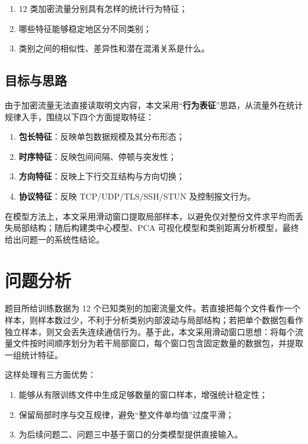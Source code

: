 \documentclass[UTF8,a4paper,12pt]{ctexart}
\begin{document}
\begin{enumerate}[label=(\arabic*)]
    \item 12 类加密流量分别具有怎样的统计行为特征；
    \item 哪些特征能够稳定地区分不同类别；
    \item 类别之间的相似性、差异性和潜在混淆关系是什么。
\end{enumerate}

\subsection{目标与思路}
由于加密流量无法直接读取明文内容，本文采用“\textbf{行为表征}”思路，从流量外在统计规律入手，围绕以下四个方面提取特征：
\begin{enumerate}[label=(\arabic*)]
    \item \textbf{包长特征}：反映单包数据规模及其分布形态；
    \item \textbf{时序特征}：反映包间间隔、停顿与突发性；
    \item \textbf{方向特征}：反映上下行交互结构与方向切换；
    \item \textbf{协议特征}：反映 TCP/UDP/TLS/SSH/STUN 及控制报文行为。
\end{enumerate}

在模型方法上，本文采用滑动窗口提取局部样本，以避免仅对整份文件求平均而丢失局部结构；随后构建类中心模型、PCA 可视化模型和类别距离分析模型，最终给出问题一的系统性结论。

\section{问题分析}

题目所给训练数据为 12 个已知类别的加密流量文件。若直接把每个文件看作一个样本，则样本数过少，不利于分析类别内部波动与局部结构；若把单个数据包看作独立样本，则又会丢失连续通信行为。基于此，本文采用滑动窗口思想：将每个流量文件按时间顺序划分为若干局部窗口，每个窗口包含固定数量的数据包，并提取一组统计特征。

这样处理有三方面优势：

\begin{enumerate}[label=(\arabic*)]
    \item 能够从有限训练文件中生成足够数量的窗口样本，增强统计稳定性；
    \item 保留局部时序与交互规律，避免“整文件单均值”过度平滑；
    \item 为后续问题二、问题三中基于窗口的分类模型提供直接输入。
\end{enumerate}
\end{document}
